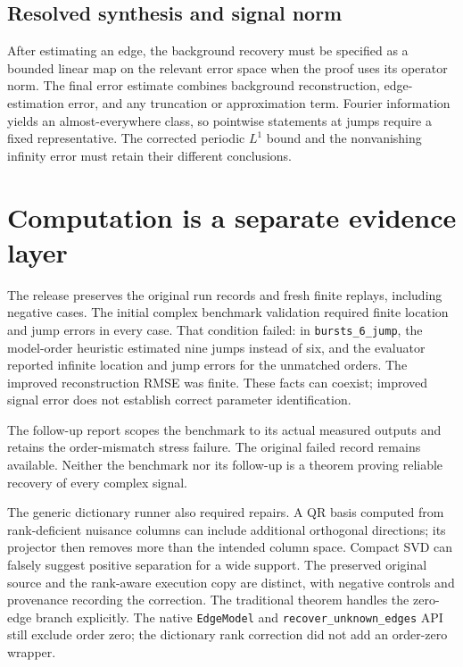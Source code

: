 \documentclass[11pt]{article}
\begin{document}
\hypertarget{resolved-synthesis-and-signal-norm}{%
\subsection{Resolved synthesis and signal norm}\label{resolved-synthesis-and-signal-norm}}

After estimating an edge, the background recovery must be specified as a bounded linear map on the relevant error space when the proof uses its operator norm. The final error estimate combines background reconstruction, edge-estimation error, and any truncation or approximation term. Fourier information yields an almost-everywhere class, so pointwise statements at jumps require a fixed representative. The corrected periodic \(L^1\) bound and the nonvanishing infinity error must retain their different conclusions.

\hypertarget{computation-is-a-separate-evidence-layer}{%
\section{Computation is a separate evidence layer}\label{computation-is-a-separate-evidence-layer}}

The release preserves the original run records and fresh finite replays, including negative cases. The initial complex benchmark validation required finite location and jump errors in every case. That condition failed: in \texttt{bursts\_6\_jump}, the model-order heuristic estimated nine jumps instead of six, and the evaluator reported infinite location and jump errors for the unmatched orders. The improved reconstruction RMSE was finite. These facts can coexist; improved signal error does not establish correct parameter identification.

The follow-up report scopes the benchmark to its actual measured outputs and retains the order-mismatch stress failure. The original failed record remains available. Neither the benchmark nor its follow-up is a theorem proving reliable recovery of every complex signal.

The generic dictionary runner also required repairs. A QR basis computed from rank-deficient nuisance columns can include additional orthogonal directions; its projector then removes more than the intended column space. Compact SVD can falsely suggest positive separation for a wide support. The preserved original source and the rank-aware execution copy are distinct, with negative controls and provenance recording the correction. The traditional theorem handles the zero-edge branch explicitly. The native \texttt{EdgeModel} and \texttt{recover\_unknown\_edges} API still exclude order zero; the dictionary rank correction did not add an order-zero wrapper.
\end{document}
